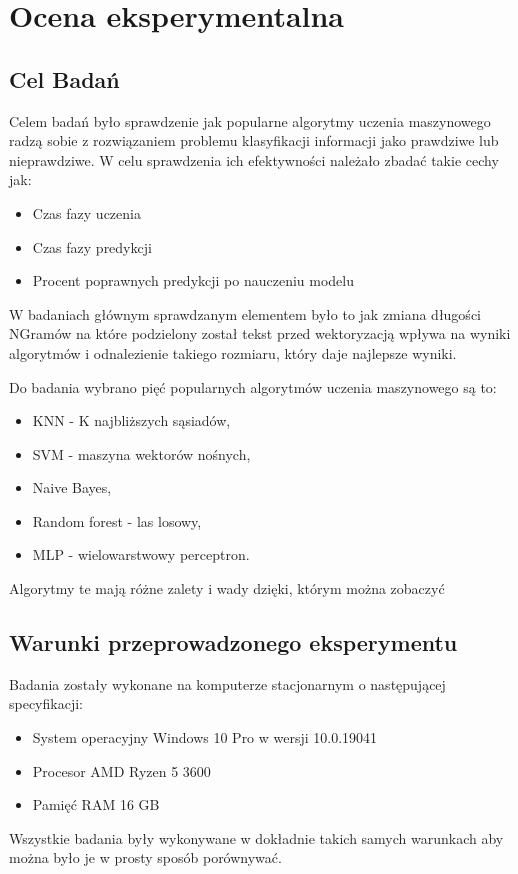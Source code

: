 \chapter{Ocena eksperymentalna}

\section{Cel Badań}
Celem badań było sprawdzenie jak popularne algorytmy uczenia maszynowego radzą sobie z rozwiązaniem problemu 
klasyfikacji informacji jako prawdziwe lub nieprawdziwe. W celu sprawdzenia ich efektywności należało zbadać
takie cechy jak:
\begin{itemize}
    \item Czas fazy uczenia
    \item Czas fazy predykcji
    \item Procent poprawnych predykcji po nauczeniu modelu
\end{itemize}
W badaniach głównym sprawdzanym elementem było to jak zmiana długości NGramów na które podzielony
został tekst przed wektoryzacją wpływa na wyniki algorytmów i odnalezienie takiego rozmiaru, który
daje najlepsze wyniki. 

Do badania wybrano pięć popularnych algorytmów uczenia maszynowego są to: 
\begin{itemize}
    \item KNN - K najbliższych sąsiadów,
    \item SVM - maszyna wektorów nośnych,
    \item Naive Bayes,
    \item Random forest - las losowy,
    \item MLP - wielowarstwowy perceptron.
\end{itemize} 
Algorytmy te mają różne zalety i wady dzięki, którym można zobaczyć 
\section{Warunki przeprowadzonego eksperymentu}
Badania zostały wykonane na komputerze stacjonarnym o następującej specyfikacji:
\begin{itemize}
    \item System operacyjny Windows 10 Pro w wersji 10.0.19041
    \item Procesor AMD Ryzen 5 3600
    \item Pamięć RAM 16 GB
\end{itemize}
Wszystkie badania były wykonywane w dokładnie takich samych warunkach aby można było 
je w prosty sposób porównywać. 

